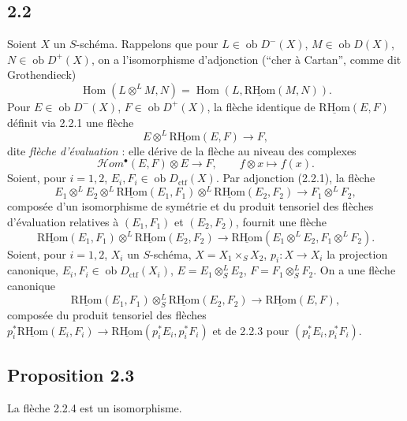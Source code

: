 \documentclass[11pt]{article}
\DeclareMathOperator{\Hom}{Hom}
\newcommand{\R}{\mathrm{R}}\newcommand{\RHomCore}{\mathrm{RHom}}
\newcommand{\ob}{\operatorname{ob}}
\providecommand{\RHom}{\RHomCore}
\providecommand{\uRHom}{\underline{\RHom}}
\providecommand{\ctf}{\mathrm{ctf}}
\providecommand{\RHom}{\RHomCore}
\providecommand{\Hom}{\operatorname{Hom}}
\providecommand{\ob}{\operatorname{ob}}
\providecommand{\RHom}{\R\mathcal{H}om}
\providecommand{\R}{\mathrm R}
\providecommand{\RHom}{\RHomCore}
\providecommand{\Hom}{\operatorname{Hom}}
\begin{document}
\subsection*{2.2}
Soient $X$ un $S$-schéma. Rappelons que pour $L\in\ob D^{-}(X)$, $M\in\ob D(X)$, $N\in\ob D^{+}(X)$, on a l'isomorphisme d'adjonction (``cher à Cartan'', comme dit Grothendieck)
\begin{equation}\tag{2.2.1}
\Hom(L\otimes^{L}M,N)=\Hom(L,\uRHom(M,N)).
\end{equation}
Pour $E\in\ob D^{-}(X)$, $F\in\ob D^{+}(X)$, la flèche identique de $\uRHom(E,F)$ définit via 2.2.1 une flèche
\begin{equation}\tag{2.2.2}
E\otimes^{L}\uRHom(E,F)\longrightarrow F,
\end{equation}
dite \emph{flèche d'évaluation} : elle dérive de la flèche au niveau des complexes
\[
\mathcal Hom^{\bullet}(E,F)\otimes E\longrightarrow F,
\qquad f\otimes x\longmapsto f(x).
\]
Soient, pour $i=1,2$, $E_i,F_i\in\ob D_{\ctf}(X)$. Par adjonction (2.2.1), la flèche
\[
E_1\otimes^{L}E_2\otimes^{L}\uRHom(E_1,F_1)\otimes^{L}\uRHom(E_2,F_2)\longrightarrow F_1\otimes^{L}F_2,
\]
composée d'un isomorphisme de symétrie et du produit tensoriel des flèches d'évaluation relatives à $(E_1,F_1)$ et $(E_2,F_2)$, fournit une flèche
\begin{equation}\tag{2.2.3}
\uRHom(E_1,F_1)\otimes^{L}\uRHom(E_2,F_2)\longrightarrow\uRHom(E_1\otimes^{L}E_2,F_1\otimes^{L}F_2).
\end{equation}
Soient, pour $i=1,2$, $X_i$ un $S$-schéma, $X=X_1\times_SX_2$, $p_i:X\to X_i$ la projection canonique, $E_i,F_i\in\ob D_{\ctf}(X_i)$, $E=E_1\otimes^{L}_{S}E_2$, $F=F_1\otimes^{L}_{S}F_2$. On a une flèche canonique
\begin{equation}\tag{2.2.4}
\uRHom(E_1,F_1)\otimes^{L}_{S}\uRHom(E_2,F_2)\longrightarrow\uRHom(E,F),
\end{equation}
composée du produit tensoriel des flèches $p_i^{*}\uRHom(E_i,F_i)\to\uRHom(p_i^{*}E_i,p_i^{*}F_i)$ et de 2.2.3 pour $(p_i^{*}E_i,p_i^{*}F_i)$.

\subsection*{Proposition 2.3}
La flèche 2.2.4 est un isomorphisme.
\end{document}
